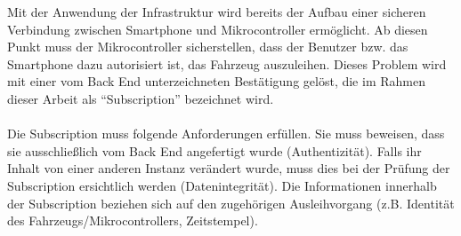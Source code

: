 Mit der Anwendung der Infrastruktur wird bereits der Aufbau einer sicheren Verbindung zwischen Smartphone und Mikrocontroller ermöglicht. Ab diesen Punkt muss der Mikrocontroller sicherstellen, dass der Benutzer bzw. das Smartphone dazu autorisiert ist, das Fahrzeug auszuleihen. Dieses Problem wird mit einer vom Back End unterzeichneten Bestätigung gelöst, die im Rahmen dieser Arbeit als "`Subscription"' bezeichnet wird.
\\\\
Die Subscription muss folgende Anforderungen erfüllen. Sie muss beweisen, dass sie ausschließlich vom Back End angefertigt wurde (Authentizität). Falls ihr Inhalt von einer anderen Instanz verändert wurde, muss dies bei der Prüfung der Subscription ersichtlich werden (Datenintegrität). Die Informationen innerhalb der Subscription beziehen sich auf den zugehörigen Ausleihvorgang (z.B. Identität des Fahrzeugs/Mikrocontrollers, Zeitstempel).